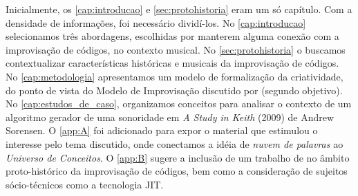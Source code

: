 Inicialmente, os \autoref{cap:introducao} e \autoref{sec:protohistoria} eram um só capítulo. Com a densidade de informações, foi necessário dividí-los. No \autoref{cap:introducao} selecionamos três abordagens, escolhidas por manterem alguma conexão com a improvisação de códigos, no contexto musical.  No \autoref{sec:protohistoria} o buscamos contextualizar características históricas e musicais da improvisação de códigos. No \autoref{cap:metodologia} apresentamos um modelo de formalização da criatividade, do ponto de vista do Modelo de Improvisação discutido por  (segundo objetivo). No \autoref{cap:estudos_de_caso}, organizamos conceitos para analisar o contexto de um algoritmo gerador de uma sonoridade em \emph{A Study in Keith} (2009) de Andrew Sorensen.  O \autoref{app:A} foi adicionado para expor o material que estimulou o interesse pelo tema discutido, onde conectamos a idéia de \emph{nuvem de palavras} ao \emph{Universo de Conceitos}. O \autoref{app:B} sugere a inclusão de um trabalho de  no âmbito proto-histórico da improvisação de códigos, bem como a consideração de sujeitos sócio-técnicos como a tecnologia JIT.